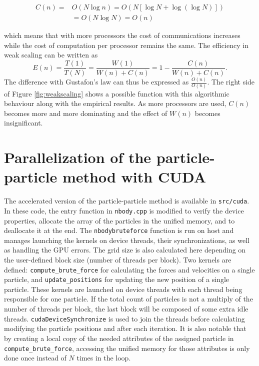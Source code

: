 \documentclass[10pt,journal,compsocconf]{IEEEtran}
\newcommand{\code}[1]{\texttt{#1}}
\begin{document}
\begin{equation*}
  \begin{aligned}
    C(n) = & O(N \log n) = O(N [\log N + \log(\log N)]) \\
    & = O(N \log N) = O(n)
  \end{aligned}
\end{equation*}

which means that with more processors the cost of communications increases while the cost of computation per processor remains the same. The efficiency in weak scaling can be written as
\begin{equation*}
  E(n) = \frac{T(1)}{T(N)} = \frac{W(1)}{W(n) + C(n)} = 1 - \frac{C(n)}{W(n) + C(n)}.
\end{equation*}
The difference with Gustafon's law can thus be expressed as $\frac{O(n)}{O(n)}$. The right side of Figure \ref{fig:weakscaling} shows a possible function with this algorithmic behaviour along with the empirical results. As more processors are used, $C(n)$ becomes more and more dominating and the effect of $W(n)$ becomes insignificant.

\section{Parallelization of the particle-particle method with CUDA}

The accelerated version of the particle-particle method is available in \code{src/cuda}. In these code, the entry function in \code{nbody.cpp} is modified to verify the device properties, allocate the array of the particles in the unified memory, and to deallocate it at the end. The \code{nbodybruteforce} function is run on host and manages launching the kernels on device threads, their synchronizations, as well as handling the GPU errors. The grid size is also calculated here depending on the user-defined block size (number of threads per block). Two kernels are defined: \code{compute\_brute\_force} for calculating the forces and velocities on a single particle, and \code{update\_positions} for updating the new position of a single particle. These kernels are launched on device threads with each thread being responsible for one particle. If the total count of particles is not a multiply of the number of threads per block, the last block will be composed of some extra idle threads. \code{cudaDeviceSynchronize} is used to join the threads before calculating modifying the particle positions and after each iteration. It is also notable that by creating a local copy of the needed attributes of the assigned particle in \code{compute\_brute\_force}, accessing the unified memory for those attributes is only done once instead of $N$ times in the loop.
\end{document}
